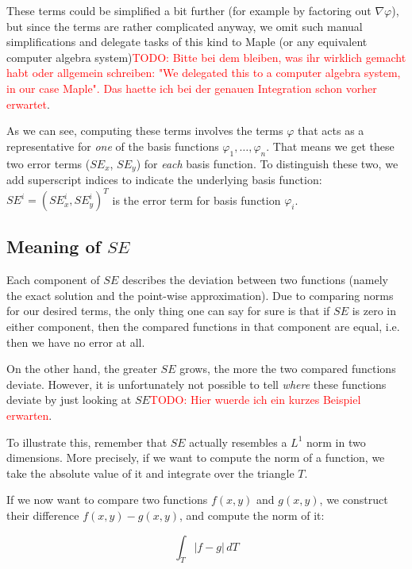 \documentclass{article}
\newcommand{\todo}[2][]{\textcolor{red}{TODO\ifthenelse{\equal{#1}{}}{}{[#1]}: #2}}
\renewcommand{\phi}{\varphi}
\begin{document}
These terms could be simplified a bit further (for example by factoring out $\nabla \phi$), but since the terms are rather complicated anyway, we omit such manual simplifications and delegate tasks of this kind to Maple (or any equivalent computer algebra system)\todo{Bitte bei dem bleiben, was ihr wirklich gemacht habt oder allgemein schreiben: "We delegated this to a computer algebra system, in our case Maple". Das haette ich bei der genauen Integration schon vorher erwartet}.

As we can see, computing these terms involves the terms $\phi$ that acts as a representative for \emph{one} of the basis functions $\phi_1,\dots,\phi_n$. That means we get these two error terms ($SE_x$, $SE_y$) for \emph{each} basis function. To distinguish these two, we add superscript indices to indicate the underlying basis function: $SE^i= \left(SE_x^i, SE_y^i\right)^T$ is the error term for basis function $\phi_i$.

\subsection{\texorpdfstring{Meaning of $SE$}{Meaning of SE}}
\label{sec:stiffness-analysis-what-does-se-mean}

Each component of $SE$ describes the deviation between two functions (namely the exact solution and the point-wise approximation). Due to comparing norms for our desired terms, the only thing one can say for sure is that if $SE$ is zero in either component, then the compared functions in that component are equal, i.e. then we have no error at all.

On the other hand, the greater $SE$ grows, the more the two compared functions deviate. However, it is unfortunately not possible to tell \emph{where} these functions deviate by just looking at $SE$\todo{Hier wuerde ich ein kurzes Beispiel erwarten}.

To illustrate this, remember that $SE$ actually resembles a $L^1$ norm in two dimensions. More precisely, if we want to compute the norm of a function, we take the absolute value of it and integrate over the triangle $T$.

If we now want to compare two functions $f(x,y)$ and $g(x,y)$, we construct their difference $f(x,y)-g(x,y)$, and compute the norm of it:

\begin{equation*}
  \int_T \left| f - g \right| \, dT
\end{equation*}
\end{document}
